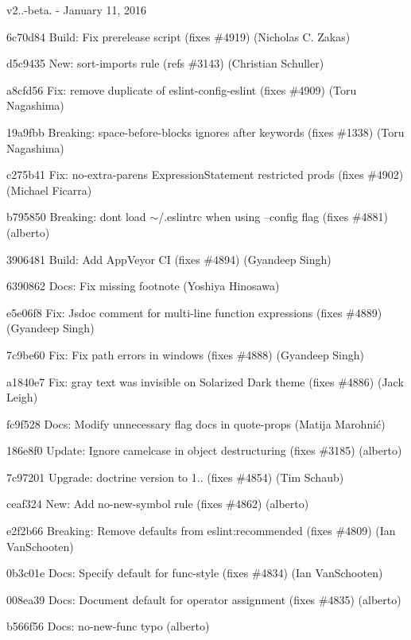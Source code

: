 v2..-\/beta. -\/ January 11, 2016


\begin{DoxyItemize}
\item 6c70d84 Build\+: Fix prerelease script (fixes \#4919) (Nicholas C. Zakas)
\item d5c9435 New\+: \textquotesingle{}sort-\/imports\textquotesingle{} rule (refs \#3143) (Christian Schuller)
\item a8cfd56 Fix\+: remove duplicate of eslint-\/config-\/eslint (fixes \#4909) (Toru Nagashima)
\item 19a9fbb Breaking\+: {\ttfamily space-\/before-\/blocks} ignores after keywords (fixes \#1338) (Toru Nagashima)
\item c275b41 Fix\+: no-\/extra-\/parens Expression\+Statement restricted prods (fixes \#4902) (Michael Ficarra)
\item b795850 Breaking\+: don\textquotesingle{}t load $\sim$/.eslintrc when using --config flag (fixes \#4881) (alberto)
\item 3906481 Build\+: Add App\+Veyor CI (fixes \#4894) (Gyandeep Singh)
\item 6390862 Docs\+: Fix missing footnote (Yoshiya Hinosawa)
\item e5e06f8 Fix\+: Jsdoc comment for multi-\/line function expressions (fixes \#4889) (Gyandeep Singh)
\item 7c9be60 Fix\+: Fix path errors in windows (fixes \#4888) (Gyandeep Singh)
\item a1840e7 Fix\+: gray text was invisible on Solarized Dark theme (fixes \#4886) (Jack Leigh)
\item fc9f528 Docs\+: Modify unnecessary flag docs in quote-\/props (Matija Marohnić)
\item 186e8f0 Update\+: Ignore camelcase in object destructuring (fixes \#3185) (alberto)
\item 7c97201 Upgrade\+: doctrine version to 1.. (fixes \#4854) (Tim Schaub)
\item ceaf324 New\+: Add no-\/new-\/symbol rule (fixes \#4862) (alberto)
\item e2f2b66 Breaking\+: Remove defaults from {\ttfamily eslint\+:recommended} (fixes \#4809) (Ian Van\+Schooten)
\item 0b3c01e Docs\+: Specify default for func-\/style (fixes \#4834) (Ian Van\+Schooten)
\item 008ea39 Docs\+: Document default for operator assignment (fixes \#4835) (alberto)
\item b566f56 Docs\+: no-\/new-\/func typo (alberto)

\end{DoxyItemize}
